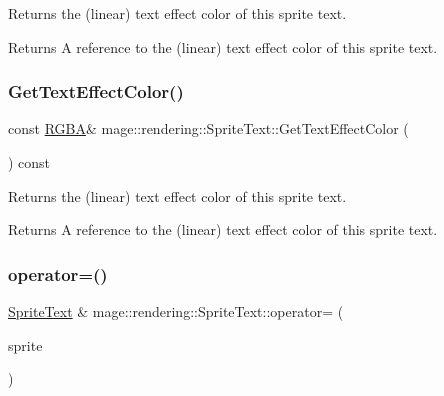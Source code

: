 Returns the (linear) text effect color of this sprite text.

\begin{DoxyReturn}{Returns}
A reference to the (linear) text effect color of this sprite text. 
\end{DoxyReturn}
\hypertarget{classmage_1_1rendering_1_1_sprite_text_a7705f00b0172153d52f31f170b12968f}{}\label{classmage_1_1rendering_1_1_sprite_text_a7705f00b0172153d52f31f170b12968f} 
\subsubsection{\texorpdfstring{Get\+Text\+Effect\+Color()}{GetTextEffectColor()}\hspace{0.1cm}{\footnotesize\ttfamily [2/2]}}
{\footnotesize\ttfamily const \hyperlink{structmage_1_1_r_g_b_a}{R\+G\+BA}\& mage\+::rendering\+::\+Sprite\+Text\+::\+Get\+Text\+Effect\+Color (\begin{DoxyParamCaption}{ }\end{DoxyParamCaption}) const\hspace{0.3cm}{\ttfamily [noexcept]}}

Returns the (linear) text effect color of this sprite text.

\begin{DoxyReturn}{Returns}
A reference to the (linear) text effect color of this sprite text. 
\end{DoxyReturn}
\hypertarget{classmage_1_1rendering_1_1_sprite_text_a50d21c24a019c0e8dc053a307ec421a6}{}\label{classmage_1_1rendering_1_1_sprite_text_a50d21c24a019c0e8dc053a307ec421a6} 
\subsubsection{\texorpdfstring{operator=()}{operator=()}\hspace{0.1cm}{\footnotesize\ttfamily [1/2]}}
{\footnotesize\ttfamily \hyperlink{classmage_1_1rendering_1_1_sprite_text}{Sprite\+Text} \& mage\+::rendering\+::\+Sprite\+Text\+::operator= (\begin{DoxyParamCaption}\item[{const \hyperlink{classmage_1_1rendering_1_1_sprite_text}{Sprite\+Text} \&}]{sprite }\end{DoxyParamCaption})\hspace{0.3cm}{\ttfamily [default]}}

